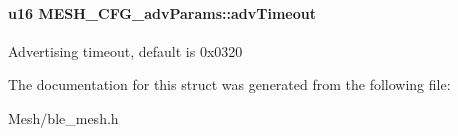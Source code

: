 \paragraph[{\texorpdfstring{adv\+Timeout}{advTimeout}}]{\setlength{\rightskip}{0pt plus 5cm}u16 M\+E\+S\+H\+\_\+\+C\+F\+G\+\_\+adv\+Params\+::adv\+Timeout}\hypertarget{struct_m_e_s_h___c_f_g__adv_params_a55bea86d7bc1302a0b30a6b78d3ad1ba}{}\label{struct_m_e_s_h___c_f_g__adv_params_a55bea86d7bc1302a0b30a6b78d3ad1ba}
Advertising timeout, default is 0x0320 

The documentation for this struct was generated from the following file\+:\begin{DoxyCompactItemize}
\item 
Mesh/ble\+\_\+mesh.\+h\end{DoxyCompactItemize}
